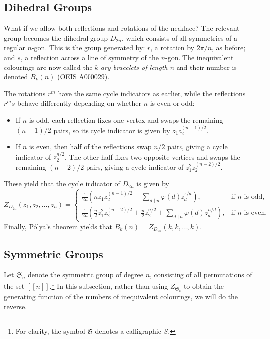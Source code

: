 \documentclass[a4paper,11pt]{article}
\numberwithin{equation}{section}
\def\llbracket{[\![}
\def\rrbracket{]\!]}
\begin{document}
    \subsection{Dihedral Groups} What if we allow both reflections and rotations of the necklace? The relevant group becomes the dihedral group $D_{2n}$, which consists of all symmetries of a regular $n$-gon. This is the group generated by: $r$, a rotation by $2\pi/n$, as before; and $s$, a reflection across a line of symmetry of the $n$-gon. The inequivalent colourings are now called the \textit{\(k\)-ary bracelets of length $n$} and their number is denoted \(B_k(n)\) (OEIS \href{https://oeis.org/A000029}{A000029}).   \smallskip
    
    The rotations $r^m$ have the same cycle indicators as earlier, while the reflections $r^m s$ behave differently depending on whether $n$ is even or odd:

    \begin{itemize}
        \item If $n$ is odd, each reflection fixes one vertex and swaps the remaining $(n-1)/2$ pairs, so its cycle indicator is given by $z_1 z_2^{(n-1)/2}$.

        \item If $n$ is even, then half of the reflections swap $n/2$ pairs, giving a cycle indicator of $ z_2^{n/2}$. The other half fixes two opposite vertices and swaps the remaining $(n-2)/2$ pairs, giving a cycle indicator of $z_1^2 z_2^{(n-2)/2}$.
    \end{itemize} These yield that the cycle indicator of $D_{2n}$ is given by
    $$Z_{D_{2n}}(z_1, z_2,  \dots, z_n) = \begin{cases}
    \frac{1}{2 n}\left(n z_1 z_2^{(n-1) / 2}+\sum_{d \mid n} \varphi(d) z_d^{z / d}\right),&\text{if $n$ is odd,} \\
    \frac{1}{2 n}\left(\frac{n}{2} z_1^2 z_2^{(n-2) / 2}+\frac{n}{2} z_2^{n / 2}+\sum_{d \mid n} \varphi(d) z_d^{n / d}\right),&\text{if $n$ is even}.
    \end{cases}$$ Finally, Pólya's theorem yields that $B_k(n) = Z_{D_{2n}}(k, k , \dots, k)$. 

    \subsection{Symmetric Groups} Let $\mathfrak{S}_n$ denote the symmetric group of degree $n$, consisting of all permutations of the set \(\llbracket n \rrbracket\).\footnote{For clarity, the symbol $\mathfrak{S}$ denotes a calligraphic $S$.} In this subsection, rather than using $Z_{\mathfrak{S}_n}$ to obtain the generating function of the numbers of inequivalent colourings, we will do the reverse.
    
\end{document}
